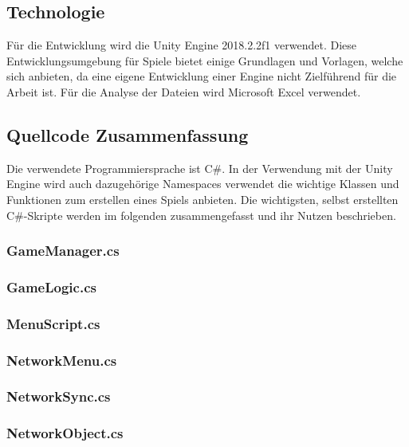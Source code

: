\subsection{Technologie}
Für die Entwicklung wird die Unity Engine 2018.2.2f1 verwendet. Diese Entwicklungsumgebung für Spiele bietet einige Grundlagen und Vorlagen, welche sich anbieten, da eine eigene Entwicklung einer Engine nicht Zielführend für die Arbeit ist. Für die Analyse der Dateien wird Microsoft Excel verwendet.

\subsection{Quellcode Zusammenfassung}
Die verwendete Programmiersprache ist C\#. In der Verwendung mit der Unity Engine wird auch dazugehörige Namespaces verwendet die wichtige Klassen und Funktionen zum erstellen eines Spiels anbieten. Die wichtigsten, selbst erstellten C\#-Skripte werden im folgenden zusammengefasst und ihr Nutzen beschrieben.
\subsubsection{GameManager.cs}
\subsubsection{GameLogic.cs}
\subsubsection{MenuScript.cs}
\subsubsection{NetworkMenu.cs}
\subsubsection{NetworkSync.cs}
\subsubsection{NetworkObject.cs}

